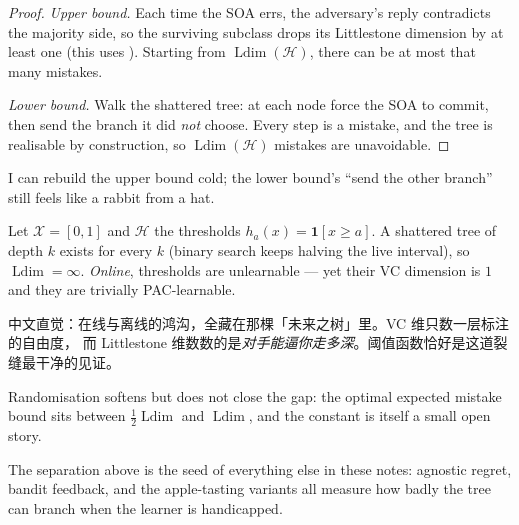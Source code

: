 \documentclass[cjk]{loom}
\begin{document}
\begin{proof}
\emph{Upper bound.} Each time the SOA errs, the adversary's reply contradicts
the majority side, so the surviving subclass drops its Littlestone dimension by
at least one (this uses ). Starting from $\operatorname{Ldim}(\mathcal
H)$, there can be at most that many mistakes.

\emph{Lower bound.} Walk the shattered tree: at each node force the SOA to
commit, then send the branch it did \emph{not} choose. Every step is a mistake,
and the tree is realisable by construction, so $\operatorname{Ldim}(\mathcal H)$
mistakes are unavoidable.
\end{proof}

 I can rebuild the upper bound cold; the lower bound's
``send the other branch'' still feels like a rabbit from a hat.

\begin{example}
Let $\mathcal X = [0,1]$ and $\mathcal H$ the thresholds
$h_a(x)=\mathbf 1[x \ge a]$. A shattered tree of depth $k$ exists for every $k$
(binary search keeps halving the live interval), so
$\operatorname{Ldim} = \infty$. \emph{Online}, thresholds are unlearnable ---
yet their VC dimension is $1$ and they are trivially PAC-learnable.
\end{example}

\begin{strand}
中文直觉：在线与离线的鸿沟，全藏在那棵「未来之树」里。VC 维只数一层标注的自由度，
而 Littlestone 维数数的是\emph{对手能逼你走多深}。阈值函数恰好是这道裂缝最干净的见证。
\end{strand}

\begin{remark}
Randomisation softens but does not close the gap: the optimal expected mistake
bound sits between $\tfrac12\operatorname{Ldim}$ and $\operatorname{Ldim}$, and
the constant is itself a small open story.
\end{remark}

%
The separation above is the seed of everything else in these notes: agnostic
regret, bandit feedback, and the apple-tasting variants all measure how badly
the tree can branch when the learner is handicapped.
\end{document}
